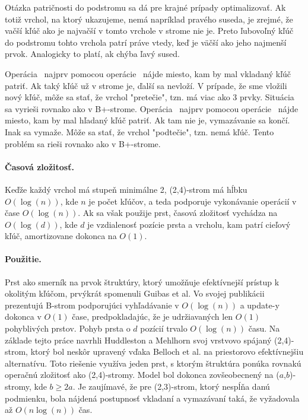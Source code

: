 Otázka patričnosti do podstromu sa dá pre krajné prípady optimalizovať. Ak totiž vrchol, na ktorý ukazujeme, nemá napríklad pravého suseda, je zrejmé, že vačší kľúč ako je najvačší v tomto vrchole v strome nie je. Preto ľubovoľný kľúč do podstromu tohto vrchola patrí práve vtedy, keď je väčší ako jeho najmenší prvok. Analogicky to platí, ak chýba ľavý sused.

Operácia \insert\ najprv pomocou operácie \find\ nájde miesto, kam by mal vkladaný kľúč patriť. Ak taký kľúč už v strome je, ďalší sa nevloží. V prípade, že sme vložili nový kľúč, môže sa stať, že vrchol "pretečie", tzn. má viac ako 3 prvky. Situácia sa vyrieši rovnako ako v B+-strome.
Operácia \delete\ najprv pomocou operácie \find\ nájde miesto, kam by mal hľadaný kľúč patriť. Ak tam nie je, vymazávanie sa končí. Inak sa vymaže. Môže sa stať, že vrchol "podtečie", tzn. nemá kľúč. Tento problém sa rieši rovnako ako v B+-strome.

\paragraph{Časová zložitosť.}
Keďže každý vrchol má stupeň minimálne 2, (2,4)-strom má hĺbku $O(\log( n ))$, kde $n$ je počet kľúčov, a teda podporuje vykonávanie operácií v čase $O(\log(n))$. Ak sa však použije prst, časová zložitosť vychádza na $O(\log( d ))$, kde $d$ je vzdialenosť pozície prsta a vrcholu, kam patrí cieľový kľúč, amortizovane dokonca na $O(1)$\citet{sahni}.

\paragraph{Použitie.}
Prst ako smerník na prvok štruktúry, ktorý umožňuje efektívnejší prístup k okolitým kľúčom, prvýkrát spomenuli Guibas et al. Vo svojej publikácii prezentujú B-strom podporujúci vyhľadávanie v $O(\log(n))$ a update-y dokonca v $O(1)$ čase, predpokladajúc, že je udržiavaných len $O(1)$ pohyblivých prstov\citet{sahni}. Pohyb prsta o $d$ pozícií trvalo $O(\log(n))$ času. Na základe tejto práce navrhli Huddleston a Mehlhorn svoj vrstvovo spájaný (2,4)-strom, ktorý bol neskôr upravený vďaka Belloch et al. na priestorovo efektívnejšiu alternatívu. Toto riešenie využíva jeden prst, s ktorým štruktúra ponúka rovnakú operačnú zložitosť ako (2,4)-stromy. Model bol dokonca zovšeobecnený na ($a$,$b$)-stromy, kde $b\geq 2a$. Je zaujímavé, že pre (2,3)-strom, ktorý nespĺňa danú podmienku, bola nájdená postupnosť vkladaní a vymazávaní taká, že vyžadovala až $O(n\log(n))$ čas\citet{sahni}.

